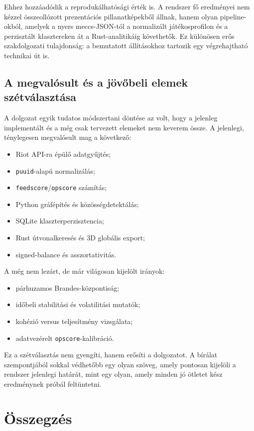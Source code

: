 \documentclass[a4paper,12pt]{report}
\begin{document}
Ehhez hozzáadódik a reprodukálhatósági érték is. A rendszer fő eredményei nem kézzel összeollózott prezentációs pillanatképekből állnak, hanem olyan pipeline-okból, amelyek a nyers meccs-JSON-tól a normalizált játékosprofilon és a perzisztált klasztereken át a Rust-analitikáig követhetők. Ez különösen erős szakdolgozati tulajdonság: a bemutatott állításokhoz tartozik egy végrehajtható technikai út is.

\section{A megvalósult és a jövőbeli elemek szétválasztása}

A dolgozat egyik tudatos módszertani döntése az volt, hogy a jelenleg implementált és a még csak tervezett elemeket nem keverem össze. A jelenlegi, ténylegesen megvalósult mag a következő:

\begin{itemize}
    \item Riot API-ra épülő adatgyűjtés;
    \item \texttt{puuid}-alapú normalizálás;
    \item \texttt{feedscore}/\texttt{opscore} számítás;
    \item Python gráfépítés és közösségdetektálás;
    \item SQLite klaszterperzisztencia;
    \item Rust útvonalkeresés és 3D globális export;
    \item signed-balance és asszortativitás.
\end{itemize}

A még nem lezárt, de már világosan kijelölt irányok:

\begin{itemize}
    \item párhuzamos Brandes-központiság;
    \item időbeli stabilitási és volatilitási mutatók;
    \item kohézió versus teljesítmény vizsgálata;
    \item adatvezérelt \texttt{opscore}-kalibráció.
\end{itemize}

Ez a szétválasztás nem gyengíti, hanem erősíti a dolgozatot. A bírálat szempontjából sokkal védhetőbb egy olyan szöveg, amely pontosan kijelöli a rendszer jelenlegi határát, mint egy olyan, amely minden jó ötletet kész eredménynek próbál feltüntetni.

\chapter{Összegzés}
\end{document}

